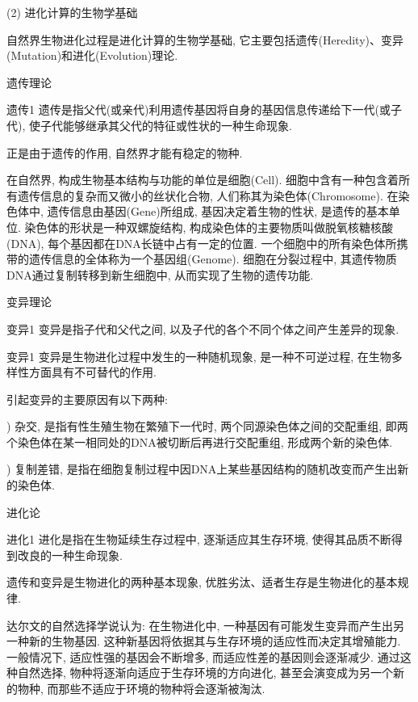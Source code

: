   (2) 进化计算的生物学基础

  自然界生物进化过程是进化计算的生物学基础, 它主要包括遗传(Heredity)、变异(Mutation)和进化(Evolution)理论.

   遗传理论
\begin{mydef}{遗传}{1}
    遗传是指父代(或亲代)利用遗传基因将自身的基因信息传递给下一代(或子代), 使子代能够继承其父代的特征或性状的一种生命现象.
\end{mydef}
  正是由于遗传的作用, 自然界才能有稳定的物种.

  在自然界, 构成生物基本结构与功能的单位是细胞(Cell). 细胞中含有一种包含着所有遗传信息的复杂而又微小的丝状化合物, 人们称其为染色体(Chromosome).
  在染色体中, 遗传信息由基因(Gene)所组成, 基因决定着生物的性状, 是遗传的基本单位.
  染色体的形状是一种双螺旋结构, 构成染色体的主要物质叫做脱氧核糖核酸(DNA), 每个基因都在DNA长链中占有一定的位置.
  一个细胞中的所有染色体所携带的遗传信息的全体称为一个基因组(Genome).
  细胞在分裂过程中, 其遗传物质DNA通过复制转移到新生细胞中, 从而实现了生物的遗传功能.

    变异理论

   \begin{mydef}{变异}{1}
    变异是指子代和父代之间, 以及子代的各个不同个体之间产生差异的现象.
    \end{mydef}
    \begin{mydef}{变异}{1}
        变异是生物进化过程中发生的一种随机现象, 是一种不可逆过程, 在生物多样性方面具有不可替代的作用.
    \end{mydef}
    引起变异的主要原因有以下两种:

    ) 杂交, 是指有性生殖生物在繁殖下一代时, 两个同源染色体之间的交配重组, 即两个染色体在某一相同处的DNA被切断后再进行交配重组, 形成两个新的染色体.

   ) 复制差错, 是指在细胞复制过程中因DNA上某些基因结构的随机改变而产生出新的染色体.

      进化论
    \begin{mydef}{进化}{1}
        进化是指在生物延续生存过程中, 逐渐适应其生存环境, 使得其品质不断得到改良的一种生命现象.
    \end{mydef}

    遗传和变异是生物进化的两种基本现象, 优胜劣汰、适者生存是生物进化的基本规律.

    达尔文的自然选择学说认为: 在生物进化中, 一种基因有可能发生变异而产生出另一种新的生物基因. 这种新基因将依据其与生存环境的适应性而决定其增殖能力.
    一般情况下, 适应性强的基因会不断增多, 而适应性差的基因则会逐渐减少.
    通过这种自然选择, 物种将逐渐向适应于生存环境的方向进化, 甚至会演变成为另一个新的物种, 而那些不适应于环境的物种将会逐渐被淘汰.
